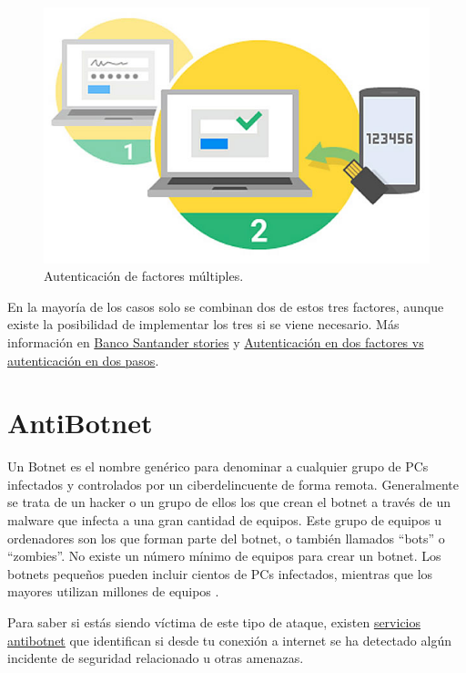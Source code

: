 \documentclass[
  spanish,
  a4paper,
  openany]{book}
\begin{document}
\begin{figure}

{\centering \includegraphics[width=0.5\linewidth]{images/autenticación-factor-múltiple} 

}

\caption{Autenticación de factores múltiples.}\label{fig:unnamed-chunk-14}
\end{figure}

En la mayoría de los casos solo se combinan dos de estos tres factores, aunque existe la posibilidad de implementar los tres si se viene necesario. Más información en \href{https://www.santander.com/es/stories/pon-una-capa-extra-de-seguridad-online-con-la-autenticacion-multifactor}{Banco Santander stories} y \href{https://protegermipc.net/2016/03/18/autenticacion-en-dos-factores-vs-autenticacion-en-dos-pasos/}{Autenticación en dos factores vs autenticación en dos pasos}.

\hypertarget{antibotnet}{%
\section{AntiBotnet}\label{antibotnet}}

Un Botnet es el nombre genérico para denominar a cualquier grupo de PCs infectados y controlados por un ciberdelincuente de forma remota. Generalmente se trata de un hacker o un grupo de ellos los que crean el botnet a través de un malware que infecta a una gran cantidad de equipos. Este grupo de equipos u ordenadores son los que forman parte del botnet, o también llamados ``bots'' o ``zombies''. No existe un número mínimo de equipos para crear un botnet. Los botnets pequeños pueden incluir cientos de PCs infectados, mientras que los mayores utilizan millones de equipos \citep{INCI-botnet}.

Para saber si estás siendo víctima de este tipo de ataque, existen \href{https://www.osi.es/es/servicio-antibotnet}{servicios antibotnet} que identifican si desde tu conexión a internet se ha detectado algún incidente de seguridad relacionado u otras amenazas.
\end{document}
